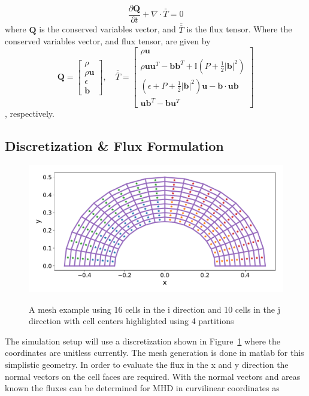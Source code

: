 \documentclass[paper=a4, fontsize=11pt]{scrartcl}
\newcommand*{\rttensor}[1]{\overline{\overline{#1}}}
\newcommand{\pfrac}[2]{\frac{\partial#1}{\partial#2}}
\numberwithin{equation}{section}                %
\numberwithin{figure}{section}                  %
\numberwithin{table}{section}                           %
\begin{document}
\begin{equation}\label{eqn:mhdvector}
  \pfrac{\mathbf{Q}}{t} + \nabla \cdot \rttensor{T} = 0
\end{equation}
where $\mathbf{Q}$ is the conserved variables vector, and $\rttensor{T}$ is the flux tensor. Where the conserved variables vector, and flux tensor, are given by
\[
  \mathbf{Q}=
  \begin{bmatrix}
    \rho  \\
    \rho \mathbf{u}  \\
    \epsilon\\
    \mathbf{b} 
  \end{bmatrix}
  ,\quad \rttensor{T} =
  \begin{bmatrix}
    \rho \mathbf{u}  \\
    \rho \mathbf{u}\mathbf{u}^T - \mathbf{b}\mathbf{b}^T + \mathbb{I}\left(P + \frac{1}{2}|\mathbf{b}|^2\right)\\
    \left(\epsilon + P + \frac{1}{2}|\mathbf{b}|^2\right)\mathbf{u}- \mathbf{b}\cdot\mathbf{u}\mathbf{b}\\
    \mathbf{u}\mathbf{b}^T-\mathbf{b}\mathbf{u}^T
  \end{bmatrix}
\]
, respectively. 

\subsection{Discretization \& Flux Formulation}
  \begin{figure}[!htb]
    \centering
    \includegraphics[width=1.0\linewidth]{fig/16x10mesh.pdf}\label{fig:ovrvw:mesh}
    \caption{A mesh example using 16 cells in the i direction and 10 cells in the j direction with cell centers highlighted using 4 partitions}
  \end{figure}

The simulation setup will use a discretization shown in Figure~\ref{fig:ovrvw:mesh} where the coordinates are unitless currently. The mesh generation is done in matlab for this simplistic geometry. In order to evaluate the flux in the x and y direction the normal vectors on the cell faces are required. With the normal vectors and areas known the fluxes can be determined for MHD in curvilinear coordinates as
\end{document}
